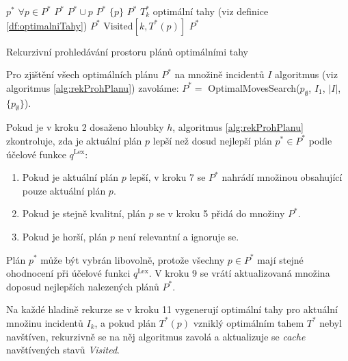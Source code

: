 \begin{algorithm}[H]
  \begin{algorithmic}[1]
      \State $p^*$ \gets $\forall p \in P^*$
        \State $P^*$ \gets $ P^* \cup p$
        \State $P^*$ \gets $\{ p \}$
      \EndIf
      \State \Return $P^*$
    \EndIf
    \State $T^*_k$ \gets optimální tahy (viz definice \ref{df:optimalniTahy})
        \State $P^*$ \gets {}
        \State $\text{Visited}[k, T^*(p)]$ \gets {}
      \EndIf
    \EndFor
    \State \Return $P^*$
  \EndFunction
  \end{algorithmic}
  \caption{Rekurzivní prohledávání prostoru plánů optimálními tahy}
  \label{alg:rekProhPlanu}
\end{algorithm}

Pro zjištění všech optimálních plánu $P^*$ na množině incidentů $I$ algoritmus (viz algoritmus \ref{alg:rekProhPlanu}) zavoláme: $P^* = $ OptimalMovesSearch($p_{\emptyset}$, $I_1$, $|I|$, $\{ p_{\emptyset} \}$).

Pokud je v kroku 2 dosaženo hloubky $h$, algoritmus \ref{alg:rekProhPlanu} zkontroluje, zda je aktuální plán $p$ lepší než dosud nejlepší plán $p^* \in P^*$ podle účelové funkce $q^{\text{Lex}}$:
\begin{enumerate}
  \item Pokud je aktuální plán $p$ lepší, v kroku 7 se $P^*$ nahrádí množinou obsahující pouze aktuální plán $p$. 
  \item Pokud je stejně kvalitní, plán $p$ se v kroku 5 přidá do množiny $P^*$.
  \item Pokud je horší, plán $p$ není relevantní a ignoruje se.
\end{enumerate}
Plán $p^*$ může být vybrán libovolně, protože všechny $p \in P^*$ mají stejné ohodnocení při účelové funkci $q^{\text{Lex}}$.
V kroku 9 se vrátí aktualizovaná množina doposud nejlepších nalezených plánů $P^*$.

Na každé hladině rekurze se v kroku 11 vygenerují optimální tahy pro aktuální množinu incidentů $I_k$, a pokud plán $T^*(p)$ vzniklý optimálním tahem $T^*$ nebyl navštíven,
rekurzivně se na něj algoritmus zavolá a aktualizuje se \textit{cache} navštívených stavů \textit{Visited}.

